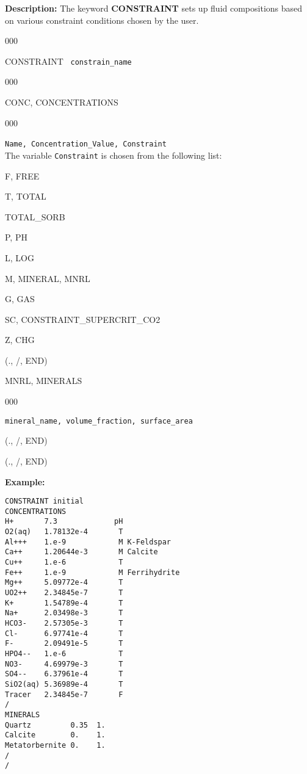 \documentclass[12pt]{article}
\begin{document}
\noindent
{\bf Description:}
The keyword {\bf CONSTRAINT} sets up fluid compositions based on various constraint conditions chosen by the user.

\begin{deflist}{000}
\item [CONSTRAINT] \ {\tt constrain\_name}
\begin{deflist}{000}
\item[CONC, CONCENTRATIONS]
\begin{deflist}{000}
\item[{\tt Name, Concentration\_Value, Constraint}] ~\\
The variable {\tt Constraint} is chosen from the following list:
\item[F, FREE]
\item[T, TOTAL] 
\item[TOTAL\_SORB]
\item[P, PH]
\item[L, LOG] 
\item[M, MINERAL, MNRL]
\item[G, GAS]
\item[SC, CONSTRAINT\_SUPERCRIT\_CO2] 
\item[Z, CHG]
\end{deflist}
\item[(., /, END)]
\item[MNRL, MINERALS] ~
\begin{deflist}{000}
\item[{\tt mineral\_name, volume\_fraction, surface\_area}]
\end{deflist}
\item[(., /, END)]
\end{deflist}
\item[(., /, END)]
\end{deflist}


\noindent
{\bf Example:}
\begin{verbatim}
CONSTRAINT initial
CONCENTRATIONS
H+       7.3             pH
O2(aq)   1.78132e-4       T
Al+++    1.e-9            M K-Feldspar
Ca++     1.20644e-3       M Calcite
Cu++     1.e-6            T
Fe++     1.e-9            M Ferrihydrite
Mg++     5.09772e-4       T
UO2++    2.34845e-7       T
K+       1.54789e-4       T
Na+      2.03498e-3       T
HCO3-    2.57305e-3       T
Cl-      6.97741e-4       T
F-       2.09491e-5       T
HPO4--   1.e-6            T
NO3-     4.69979e-3       T
SO4--    6.37961e-4       T
SiO2(aq) 5.36989e-4       T
Tracer   2.34845e-7       F
/
MINERALS
Quartz         0.35  1.
Calcite        0.    1.
Metatorbernite 0.    1.
/
/
\end{verbatim}
\end{document}
